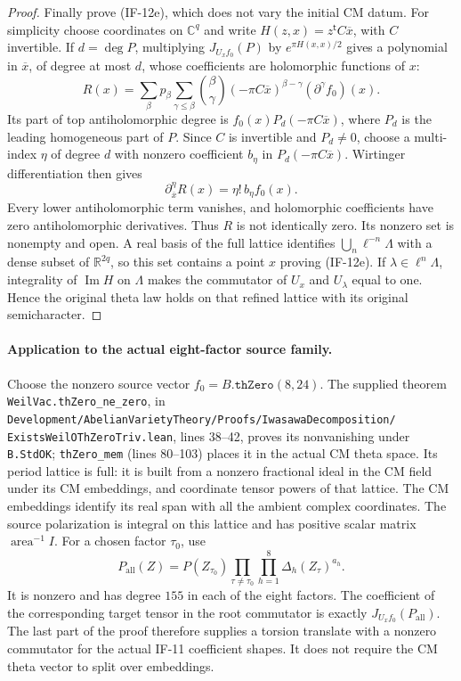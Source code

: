 \begin{proof}
Finally prove (IF-12e), which does not vary the initial CM datum.
For simplicity choose coordinates on $\mathbb C^q$ and write
$H(z,x)=z^{\mathsf t}C\overline x$, with $C$ invertible. If
$d=\deg P$, multiplying $J_{U_x f_0}(P)$ by
$e^{\pi H(x,x)/2}$ gives a polynomial in $\overline x$, of degree
at most $d$, whose coefficients are holomorphic functions of $x$:
\[
 R(x)=\sum_\beta p_\beta\sum_{\gamma\le\beta}
    {\beta\choose\gamma}(-\pi C\overline x)^{\beta-\gamma}
                                      (\partial^\gamma f_0)(x).
                                                               \tag{IF-12q}
\]
Its part of top antiholomorphic degree is
$f_0(x)P_d(-\pi C\overline x)$, where $P_d$ is the leading
homogeneous part of $P$. Since $C$ is invertible and $P_d\ne0$,
choose a multi-index $\eta$ of degree $d$ with nonzero coefficient
$b_\eta$ in $P_d(-\pi C\overline x)$. Wirtinger differentiation
then gives
\[
             \partial_{\overline x}^{\eta}R(x)
                        =\eta!\,b_\eta f_0(x).                \tag{IF-12r}
\]
Every lower antiholomorphic term vanishes, and holomorphic
coefficients have zero antiholomorphic derivatives. Thus $R$ is not
identically zero. Its nonzero set is nonempty and open. A real basis
of the full lattice identifies
$\bigcup_n\ell^{-n}\Lambda$ with a dense subset of
$\mathbb R^{2q}$, so this set contains a point $x$ proving
(IF-12e). If $\lambda\in\ell^n\Lambda$, integrality of
$\operatorname{Im}H$ on $\Lambda$ makes the commutator of
$U_x$ and $U_\lambda$ equal to one. Hence the original theta law
holds on that refined lattice with its original semicharacter.
\end{proof}

\paragraph{Application to the actual eight-factor source family.}
Choose the nonzero source vector
$f_0=B.\texttt{thZero}(8,24)$.
The supplied theorem \texttt{WeilVac.thZero\_ne\_zero}, in
\texttt{Development/AbelianVarietyTheory/Proofs/IwasawaDecomposition/}
\texttt{ExistsWeilOThZeroTriv.lean}, lines 38--42, proves its
nonvanishing under \texttt{B.StdOK}; \texttt{thZero\_mem}
(lines 80--103) places it in the actual CM theta space. Its period
lattice is full: it is built from a nonzero fractional ideal in the
CM field under its CM embeddings, and coordinate tensor powers of
that lattice. The CM embeddings identify its real span with all the
ambient complex coordinates. The source polarization is integral on
this lattice and has positive scalar matrix $\operatorname{area}^{-1}I$.
For a chosen factor $\tau_0$, use
\[
 P_{\mathrm{all}}(Z)=P(Z_{\tau_0})
          \prod_{\tau\ne\tau_0}\prod_{h=1}^{8}
                         \Delta_h(Z_\tau)^{a_h}.               \tag{IF-12s}
\]
It is nonzero and has degree $155$ in each of the eight factors.
The coefficient of the corresponding target tensor in the root
commutator is exactly $J_{U_xf_0}(P_{\mathrm{all}})$.
The last part of the proof therefore supplies a torsion translate
with a nonzero commutator for the actual IF-11 coefficient shapes.
It does not require the CM theta vector to split over embeddings.

